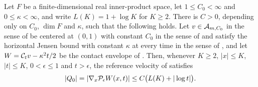 \begin{lemma}
Let $F$ be a finite-dimensional real inner-product space, let
$1\le C_0<\infty$ and $0\le\kappa<\infty$, and write $L(K)=1+\log K$ for
$K\ge2$. There is $C>0$, depending only on $C_0$, $\dim F$ and $\kappa$, such
that the following holds. Let $v\in\mathcal{A}_{m,C_0}$ in the sense of
 be centered at $(0,1)$ with constant $C_0$ in the sense of
 and satisfy the horizontal Jensen bound with constant
$\kappa$ at every time in the sense of , and let
$W=\mathcal{C}_tv-\kappa^2t/2$ be the contact envelope of . Then,
whenever $K\ge2$, $|x|\le K$, $|t|\le K$, $0<\epsilon\le1$ and $t>\epsilon$, the
reference velocity of  satisfies
\begin{equation}\label{eq:dp-log-velocity}
  |Q_0|=|\nabla_x\mathcal{P}_\epsilon W(x,t)|
       \le C\bigl(L(K)+|\log t|\bigr).
\end{equation}
\end{lemma}
